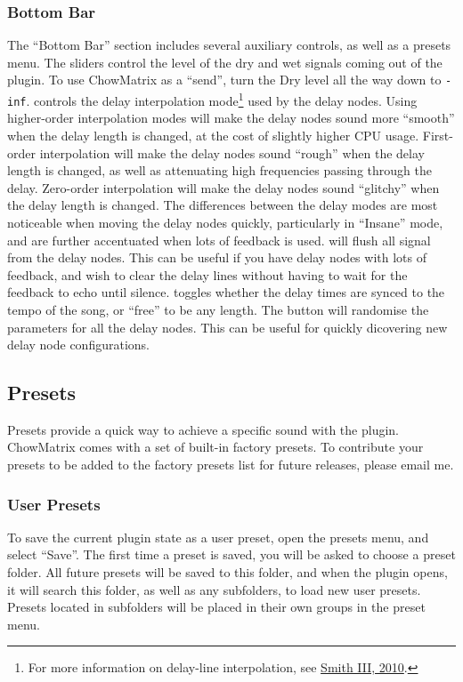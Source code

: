 \documentclass[landscape,twocolumn,a5paper]{manual}
\begin{document}
\subsubsection{Bottom Bar}
The ``Bottom Bar'' section includes several auxiliary controls,
as well as a presets menu.
\newpar
The  sliders control the level of the dry
and wet signals coming out of the plugin. To use ChowMatrix as
a ``send'', turn the Dry level all the way down to \texttt{-inf}.
\newpar
{} controls the delay interpolation
mode\footnote{For more information on delay-line interpolation, see \href{https://ccrma.stanford.edu/~jos/pasp/Delay_Line_Signal_Interpolation.html}{Smith III, 2010}.}
used by the delay nodes. Using higher-order interpolation modes
will make the delay nodes sound more ``smooth'' when the delay
length is changed, at the cost of slightly higher CPU usage.
First-order interpolation will make the delay nodes sound ``rough''
when the delay length is changed, as well as attenuating high
frequencies passing through the delay. Zero-order interpolation
will make the delay nodes sound  ``glitchy'' when the delay length
is changed. The differences between the delay modes are most noticeable
when moving the delay nodes quickly, particularly in ``Insane'' mode,
and are further accentuated when lots of feedback is used.
\newpar
{} will flush all signal from the delay nodes.
This can be useful if you have delay nodes with lots of feedback,
and wish to clear the delay lines without having to wait for
the feedback to echo until silence.
\newpar
{} toggles whether the delay times are synced
to the tempo of the song, or ``free'' to be any length.
\newpar
The  button will randomise the parameters
for all the delay nodes. This can be useful for quickly
dicovering new delay node configurations.

\subsection{Presets}
Presets provide a quick way to achieve a specific sound
with the plugin. ChowMatrix comes with a set of built-in
factory presets. To contribute your presets to be added
to the factory presets list for future releases, please
email me.

\subsubsection{User Presets}
To save the current plugin state as a user preset, open
the presets menu, and select ``Save''. The first time a
preset is saved, you will be asked to choose a preset
folder. All future presets will be saved to this folder,
and when the plugin opens, it will search this folder, as
well as any subfolders, to load new user presets.
Presets located in subfolders will be placed in their
own groups in the preset menu.
\end{document}
